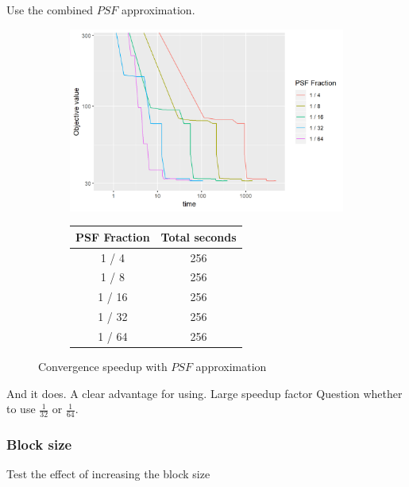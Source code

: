 Use the combined $PSF$ approximation.
\begin{figure}[h]
	\centering
	\begin{subfigure}{0.6\linewidth}
		\includegraphics[width=1.0\linewidth]{./chapters/05.pcdm/parameters/psfSize.png}
	\end{subfigure}
	\begin{subfigure}{0.35\linewidth}
		\begin{tabular}{c | c}
			PSF Fraction & Total seconds \\ \hline
			1 / 4 & 256 \\
			1 / 8 & 256 \\
			1 / 16 & 256 \\
			1 / 32 & 256 \\
			1 / 64 & 256 \\
		\end{tabular}
	\end{subfigure}
	\caption{Convergence speedup with $PSF$ approximation}
\end{figure}

And it does. A clear advantage for using. Large speedup factor
Question whether to use $\frac{1}{32}$ or $\frac{1}{64}$.


\subsubsection{Block size}
Test the effect of increasing the block size

